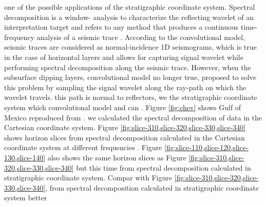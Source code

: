  one of the possible applications of the stratigraphic coordinate system. 
Spectral decomposition is a window- analysis to characterize the reflecting wavelet of an interpretation target and refers to any method that produces a continuous time-frequency analysis of a seismic trace \cite[]{partyka1999}. According to the convolutional model, seismic traces are considered as normal-incidence 1D seismograms, which is true in the case of horizontal layers and allows for capturing  signal wavelet while performing spectral decomposition along the seismic trace. However, when the subsurface  dipping layers,  convolutional model no longer  true,  \cite{guomarfurt} proposed to solve this problem by sampling the signal wavelet along the ray-path on which the wavelet travels.  this path is normal to reflectors, we   the stratigraphic coordinate system\new{,} which   convolutional model and can . Figure \ref{fig:chev} shows Gulf of Mexico  reproduced from \cite{lomask2006}  .  we calculated the spectral decomposition of  data in the Cartesian coordinate system. Figure \ref{fig:slice-310,slice-320,slice-330,slice-340} shows horizon slices from spectral decomposition calculated in the Cartesian coordinate system at different frequencies . Figure \ref{fig:slice-110,slice-120,slice-130,slice-140} also shows the same horizon slices as Figure \ref{fig:slice-310,slice-320,slice-330,slice-340}\new{,} but this time from spectral decomposition calculated in  stratigraphic coordinate system. Compar with  Figure \ref{fig:slice-310,slice-320,slice-330,slice-340},  from spectral decomposition calculated in  stratigraphic coordinate system better 